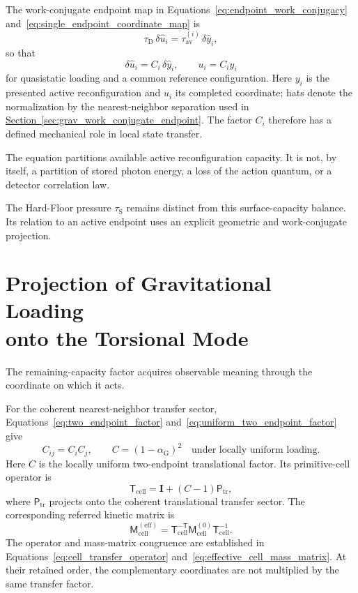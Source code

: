 The work-conjugate endpoint map in Equations~\eqref{eq:endpoint_work_conjugacy} and~\eqref{eq:single_endpoint_coordinate_map} is
\begin{equation}
    \tau_{\mathrm D}\,\delta\widehat u_i
    =\tau_{\mathrm{av}}^{(i)}\,\delta\widehat y_i,
\end{equation}
so that
\begin{equation}
    \delta\widehat u_i=C_i\,\delta\widehat y_i,
    \qquad
    u_i=C_i y_i
\end{equation}
for quasistatic loading and a common reference configuration. Here $y_i$ is the presented active reconfiguration and $u_i$ its completed coordinate; hats denote the normalization by the nearest-neighbor separation used in \hyperref[sec:grav_work_conjugate_endpoint]{Section~\ref*{sec:grav_work_conjugate_endpoint}}. The factor $C_i$ therefore has a defined mechanical role in local state transfer.

The equation partitions available active reconfiguration capacity. It is not, by itself, a partition of stored photon energy, a loss of the action quantum, or a detector correlation law.

The Hard-Floor pressure $\tau_{\mathrm S}$ remains distinct from this surface-capacity balance. Its relation to an active endpoint uses an explicit geometric and work-conjugate projection.

\section[Projection of Gravitational Loading onto the Torsional Mode]{Projection of Gravitational Loading\\onto the Torsional Mode}

The remaining-capacity factor acquires observable meaning through the coordinate on which it acts.

For the coherent nearest-neighbor transfer sector, Equations~\eqref{eq:two_endpoint_factor} and~\eqref{eq:uniform_two_endpoint_factor} give
\begin{equation}
    C_{ij}=C_iC_j,
    \qquad
    C=(1-\alpha_{\mathrm G})^2
    \quad\text{under locally uniform loading}.
\end{equation}
Here $C$ is the locally uniform two-endpoint translational factor. Its primitive-cell operator is
\begin{equation}
    \mathsf T_{\mathrm{cell}}
    =\mathbf I+(C-1)\mathsf P_{\mathrm{tr}},
\end{equation}
where $\mathsf P_{\mathrm{tr}}$ projects onto the coherent translational transfer sector. The corresponding referred kinetic matrix is
\begin{equation}
    \boxed{
    \mathsf M_{\mathrm{cell}}^{(\mathrm{eff})}
    =\mathsf T_{\mathrm{cell}}^{-\mathsf T}
     \mathsf M_{\mathrm{cell}}^{(0)}
     \mathsf T_{\mathrm{cell}}^{-1}
    }.
\end{equation}
The operator and mass-matrix congruence are established in Equations~\eqref{eq:cell_transfer_operator} and~\eqref{eq:effective_cell_mass_matrix}. At their retained order, the complementary coordinates are not multiplied by the same transfer factor.

